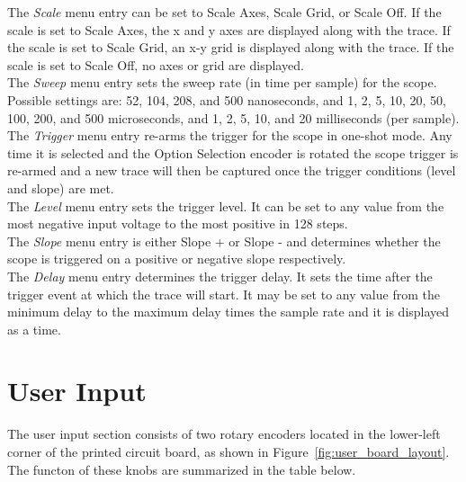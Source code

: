 \documentclass{scrartcl}
\begin{document}
The \textit{Scale} menu entry can be set to Scale Axes, Scale Grid, or Scale Off. If the scale is set to Scale Axes, the x and y axes are displayed along with the trace. If the scale is set to Scale Grid, an x-y grid is displayed along with the trace. If the scale is set to Scale Off, no axes or grid are displayed.\\

The \textit{Sweep} menu entry sets the sweep rate (in time per sample) for the scope. Possible settings are: 52, 104, 208, and 500 nanoseconds, and 1, 2, 5, 10, 20, 50, 100, 200, and 500 microseconds, and 1, 2, 5, 10, and 20 milliseconds (per sample).\\

The \textit{Trigger} menu entry re-arms the trigger for the scope in one-shot mode. Any time it is selected and the Option Selection encoder is rotated the scope trigger is re-armed and a new trace will then be captured once the trigger conditions (level and slope) are met.\\

The \textit{Level} menu entry sets the trigger level. It can be set to any value from the most negative input voltage to the most positive in 128 steps.\\

The \textit{Slope} menu entry is either Slope + or Slope - and determines whether the scope is triggered on a positive or negative slope respectively.\\

The \textit{Delay} menu entry determines the trigger delay. It sets the time after the trigger event at which the trace will start. It may be set to any value from the minimum delay to the maximum delay times the sample rate and it is displayed as a time.\\

	\section*{User Input}
	The user input section consists of two rotary encoders located in the lower-left corner of the printed circuit board, as shown in Figure~\ref{fig:user_board_layout}. The functon of these knobs are summarized in the table below.
\end{document}

